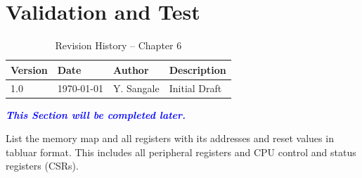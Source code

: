 \chapter{Validation and Test}

\begin{table}[H]
\caption{Revision History – Chapter 6}
\centering
\begin{tabular}{llll}
\toprule
Version & Date & Author & Description \\
\midrule
1.0 & \today & Y. Sangale & Initial Draft \\
\bottomrule
\end{tabular}
\end{table}

\textcolor{blue}{\textbf{\textit{This Section will be completed later.}}}

List the memory map and all registers with its addresses and reset values in tabluar format. This includes all peripheral registers and CPU control and status registers (CSRs).

